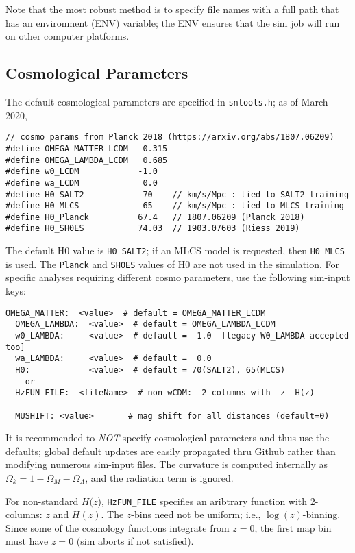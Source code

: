 \documentclass[12pt]{article}
\newcommand{\OM}{\Omega_M}
\newcommand{\OL}{\Omega_{\Lambda}}
\newcommand{\Ok}{\Omega_k}
\begin{document}
{Note that the most robust method is to specify file names with a 
full path that has an environment (ENV) variable; the ENV ensures that
the sim job will run on other computer platforms.

   \subsection{Cosmological Parameters}
   \label{subsec:sim_cosmopar}

The default cosmological parameters are specified in {\tt sntools.h};
as of March 2020,
%
\begin{Verbatim}[frame=single]
// cosmo params from Planck 2018 (https://arxiv.org/abs/1807.06209)
#define OMEGA_MATTER_LCDM   0.315 
#define OMEGA_LAMBDA_LCDM   0.685 
#define w0_LCDM            -1.0
#define wa_LCDM             0.0
#define H0_SALT2            70    // km/s/Mpc : tied to SALT2 training
#define H0_MLCS             65    // km/s/Mpc : tied to MLCS training
#define H0_Planck          67.4   // 1807.06209 (Planck 2018)
#define H0_SH0ES           74.03  // 1903.07603 (Riess 2019)
\end{Verbatim}
%
The default H0 value is {\tt H0\_SALT2};
if an MLCS model is requested, then {\tt H0\_MLCS} is used.
The {\tt Planck} and {\tt SH0ES} values of H0 are not used 
in the simulation.
For specific analyses requiring different cosmo parameters, 
use the following sim-input keys:
%
\begin{Verbatim}[frame=single]
  OMEGA_MATTER:  <value>  # default = OMEGA_MATTER_LCDM
  OMEGA_LAMBDA:  <value>  # default = OMEGA_LAMBDA_LCDM
  w0_LAMBDA:     <value>  # default = -1.0  [legacy W0_LAMBDA accepted too]
  wa_LAMBDA:     <value>  # default =  0.0
  H0:            <value>  # default = 70(SALT2), 65(MLCS)
    or
  HzFUN_FILE:  <fileName>  # non-wCDM:  2 columns with  z  H(z)

  MUSHIFT: <value>       # mag shift for all distances (default=0)
\end{Verbatim}
%
It is recommended to {\it NOT} specify cosmological parameters and thus
use the defaults; global default updates are easily propagated thru 
Github rather than modifying numerous sim-input files.
The curvature is computed internally as $\Ok = 1 - \OM - \OL$,
and the radiation term is ignored. 

For non-standard $H(z$), {\tt HzFUN\_FILE} specifies an aribtrary
function with 2-columns: $z$ and $H(z)$. 
The $z$-bins need not be uniform; i.e., $\log(z)$-binning. 
Since some of the cosmology functions integrate from $z=0$, 
the first map bin must have $z=0$ (sim aborts if not satisfied).

}
\end{document}
